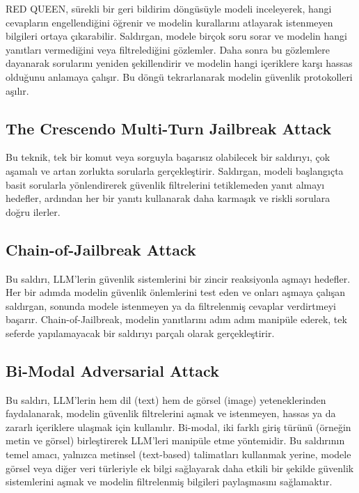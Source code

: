 RED QUEEN, sürekli bir geri bildirim döngüsüyle modeli inceleyerek, hangi cevapların engellendiğini öğrenir ve modelin kurallarını atlayarak istenmeyen bilgileri ortaya çıkarabilir. Saldırgan, modele birçok soru sorar ve modelin hangi yanıtları vermediğini veya filtrelediğini gözlemler. Daha sonra bu gözlemlere dayanarak sorularını yeniden şekillendirir ve modelin hangi içeriklere karşı hassas olduğunu anlamaya çalışır. Bu döngü tekrarlanarak modelin güvenlik protokolleri aşılır.

\newpage

\subsection{The Crescendo Multi-Turn Jailbreak Attack}

Bu teknik, tek bir komut veya sorguyla başarısız olabilecek bir saldırıyı, çok aşamalı ve artan zorlukta sorularla gerçekleştirir. Saldırgan, modeli başlangıçta basit sorularla yönlendirerek güvenlik filtrelerini tetiklemeden yanıt almayı hedefler, ardından her bir yanıtı kullanarak daha karmaşık ve riskli sorulara doğru ilerler.

\newpage

\subsection{Chain-of-Jailbreak Attack}

Bu saldırı, LLM’lerin güvenlik sistemlerini bir zincir reaksiyonla aşmayı hedefler. Her bir adımda modelin güvenlik önlemlerini test eden ve onları aşmaya çalışan saldırgan, sonunda modele istenmeyen ya da filtrelenmiş cevaplar verdirtmeyi başarır. Chain-of-Jailbreak, modelin yanıtlarını adım adım manipüle ederek, tek seferde yapılamayacak bir saldırıyı parçalı olarak gerçekleştirir.

\newpage

\subsection{Bi-Modal Adversarial Attack}

Bu saldırı, LLM'lerin hem dil (text) hem de görsel (image) yeteneklerinden faydalanarak, modelin güvenlik filtrelerini aşmak ve istenmeyen, hassas ya da zararlı içeriklere ulaşmak için kullanılır. Bi-modal, iki farklı giriş türünü (örneğin metin ve görsel) birleştirerek LLM'leri manipüle etme yöntemidir. Bu saldırının temel amacı, yalnızca metinsel (text-based) talimatları kullanmak yerine, modele görsel veya diğer veri türleriyle ek bilgi sağlayarak daha etkili bir şekilde güvenlik sistemlerini aşmak ve modelin filtrelenmiş bilgileri paylaşmasını sağlamaktır.

